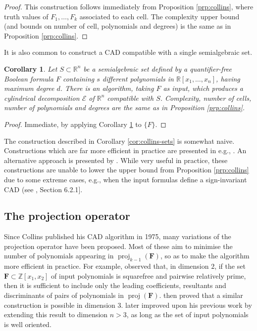 \documentclass[
]{book}
\newtheorem{corollary}{Corollary}[chapter]
\theoremstyle{definition}
\theoremstyle{definition}
\theoremstyle{definition}
\theoremstyle{definition}
\theoremstyle{remark}
\begin{document}
\begin{proof}
This construction follows immediately from Proposition \ref{prp:collins}, where truth values of \(F_1,\ldots,F_k\) associated to each cell.
The complexity upper bound (and bounds on number of cell, polynomials and degrees) is the same as in Proposition \ref{prp:collins}.
\end{proof}

It is also common to construct a CAD compatible with a single semialgebraic set.

\begin{corollary}
\protect\hypertarget{cor:collins-set}{}\label{cor:collins-set}Let \(S\subset \mathbb{R}^n\) be a semialgebraic set defined by a quantifier-free Boolean formula \(F\) containing \(s\) different polynomials in \(\mathbb{R}[x_1,\ldots,x_n]\), having maximum degree \(d\).
There is an algorithm, taking \(F\) as input, which produces a cylindrical decomposition \(\mathcal E\) of \(\mathbb{R}^n\) compatible with \(S\).
Complexity, number of cells, number of polynomials and degrees are the same as in Proposition \ref{prp:collins}.
\end{corollary}

\begin{proof}
Immediate, by applying Corollary \ref{cor:collins-set} to \(\{ F \}\).
\end{proof}

The construction described in Corollary \ref{cor:collins-sets} is somewhat naive.
Constructions which are far more efficient in practice are presented in e.g., \citet{collins1991}. An alternative approach is presented by \citet{bradford2014}.
While very useful in practice, these constructions are unable to lower the upper bound from Proposition \ref{prp:collins} due to some extreme cases, e.g., when the input formulas define a sign-invariant CAD (see \citet{bradford2014}, Section 6.2.1{]}.

\hypertarget{the-projection-operator}{%
\subsection{The projection operator}\label{the-projection-operator}}

Since Collins published his CAD algorithm in 1975, many variations of the projection operator have been proposed. Most of these aim to minimise the number of polynomials appearing in \(\operatorname{proj}_{k-1}(\mathbf{F})\), so as to make the algorithm more efficient in practice.
For example, \citet{collins1975} observed that, in dimension \(2\), if the set \(\mathbf{F} \subset \mathbb{Z}[x_1,x_2]\) of input polynomials is
squarefree and pairwise relatively prime, then it is sufficient to include only the leading
coefficients, resultants and discriminants of pairs of polynomials in \(\operatorname{proj}(\mathbf{F})\). \citet{mccallum1988} then proved that a
similar construction is possible in dimension \(3\).
\citet{mccallum1998} later improved upon his previous work by extending this result to dimension \(n > 3\), as long as the set of input polynomials is well oriented.
\end{document}
